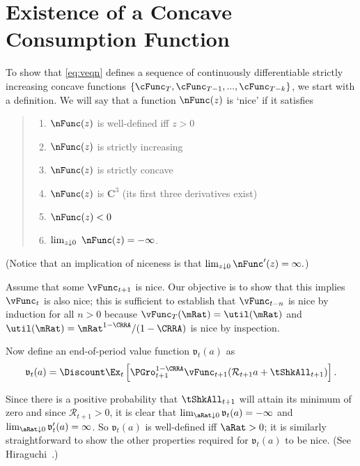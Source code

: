 \documentclass[titlepage]{\econtex}\providecommand{\texname}{BufferStockTheory}%
\providecommand{\ApndxDir}{./}
\begin{document}

%

\section{Existence of a Concave Consumption Function}\label{sec:ApndxcExists}

To show that \eqref{eq:veqn} defines a sequence of continuously
differentiable strictly increasing concave functions
$\{\cFunc_{T},\cFunc_{T-1},...,\cFunc_{T-k}\}$, we start with a
definition.  We will say that a function $\nFunc(z)$ is `nice' if it
satisfies
\begin{quote}
\begin{enumerate}\setlength{\itemsep}{0.0ex}
\item $\nFunc(z)$ is well-defined iff $z>0$

\item $\nFunc(z)$ is strictly increasing

\item $\nFunc(z)$ is strictly concave

\item $\nFunc(z)$ is $ \mathbf{C}^{3}$ (its first three derivatives exist)

\item $\nFunc(z)<0$

\item $\lim_{z\downarrow 0}~\nFunc(z) =-\infty $.

\end{enumerate}
\end{quote}

(Notice that an implication of niceness is that $\lim_{z \downarrow 0} \nFunc^{\prime}(z) = \infty.$)

Assume that some $\vFunc_{t+1}$ is nice.  Our objective is to show that this
implies $\vFunc_{t}$ is also nice; this is sufficient to establish that
$\vFunc_{t-n}$ is nice by induction for all $n > 0$ because $\vFunc_{T}(\mRat)
=\util(\mRat) $ and $\util(\mRat)=\mRat^{1-\CRRA}/(1-\CRRA)$ is nice by inspection.

Now define an end-of-period value function $\mathfrak{v}_{t}(a) $ as
\begin{equation}
\mathfrak{v}_{t}(a) =\Discount \Ex_{t}\left[{\PGro}_{t+1}^{1-\CRRA}\vFunc_{t+1}( {\mathcal{R}}_{t+1} a+{\tShkAll}_{t+1}) \right]. \label{eq:vEnd}
\end{equation}

Since there is a positive probability that $\tShkAll_{t+1}$ will
attain its minimum of zero and since $\mathcal{R}_{t+1}>0$, it
is clear that $\lim_{\aRat \downarrow 0} \mathfrak{v}_{t}(a) = -\infty$
and $\lim_{\aRat \downarrow 0} \mathfrak{v}^{\prime}_{t}(a) = \infty$.  So
$\mathfrak{v}_{t}(a) $ is well-defined iff $\aRat>0$; it is similarly
straightforward to show the other properties required for $\mathfrak{v}_{t}(a) $ to
be nice.  (See Hiraguchi~\citeyearpar{hiraguchi:bsproofs}.)
\end{document}

